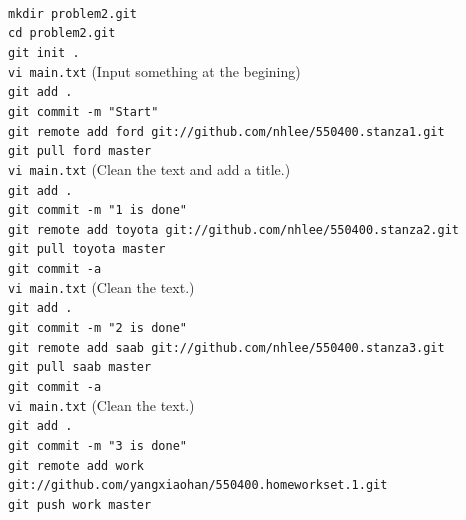 \documentclass[12pt]{article}
\begin{document}
\noindent{}\\
\verb+mkdir problem2.git+\\
\verb+cd problem2.git+\\
\verb+git init .+\\
\verb+vi main.txt+ (Input something at the begining)\\
\verb+git add .+\\
\verb+git commit -m "Start"+\\
\verb+git remote add ford git://github.com/nhlee/550400.stanza1.git+\\
\verb+git pull ford master+\\
\verb+vi main.txt+ (Clean the text and add a title.)\\
\verb+git add .+\\
\verb+git commit -m "1 is done"+\\
\verb+git remote add toyota git://github.com/nhlee/550400.stanza2.git+\\
\verb+git pull toyota master+\\
\verb+git commit -a+\\
\verb+vi main.txt+ (Clean the text.)\\
\verb+git add .+\\
\verb+git commit -m "2 is done"+\\
\verb+git remote add saab git://github.com/nhlee/550400.stanza3.git+\\
\verb+git pull saab master+\\
\verb+git commit -a+\\
\verb+vi main.txt+ (Clean the text.)\\
\verb+git add .+\\
\verb+git commit -m "3 is done"+\\
\verb+git remote add work git://github.com/yangxiaohan/550400.homeworkset.1.git+\\
\verb+git push work master+\\
\end{document}
